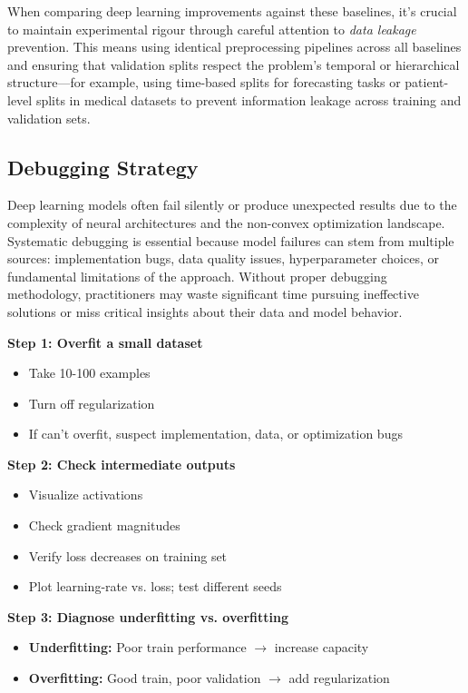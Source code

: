 When comparing deep learning improvements against these baselines, it's crucial to maintain experimental rigour through careful attention to \emph{data leakage}  prevention. This means using identical preprocessing pipelines across all baselines and ensuring that validation splits respect the problem's temporal or hierarchical structure—for example, using time-based splits for forecasting tasks or patient-level splits in medical datasets to prevent information leakage across training and validation sets.

\subsection{Debugging Strategy}

Deep learning models often fail silently or produce unexpected results due to the complexity of neural architectures and the non-convex optimization landscape. Systematic debugging is essential because model failures can stem from multiple sources: implementation bugs, data quality issues, hyperparameter choices, or fundamental limitations of the approach. Without proper debugging methodology, practitioners may waste significant time pursuing ineffective solutions or miss critical insights about their data and model behavior.


\textbf{Step 1: Overfit a small dataset}
\begin{itemize}
    \item Take 10-100 examples
    \item Turn off regularization
    \item If can't overfit, suspect implementation, data, or optimization bugs
\end{itemize}

\textbf{Step 2: Check intermediate outputs}
\begin{itemize}
    \item Visualize activations
    \item Check gradient magnitudes
    \item Verify loss decreases on training set
    \item Plot learning-rate vs. loss; test different seeds
\end{itemize}

\textbf{Step 3: Diagnose underfitting vs. overfitting}
\begin{itemize}
    \item \textbf{Underfitting:} Poor train performance $\to$ increase capacity
    \item \textbf{Overfitting:} Good train, poor validation $\to$ add regularization
\end{itemize}

